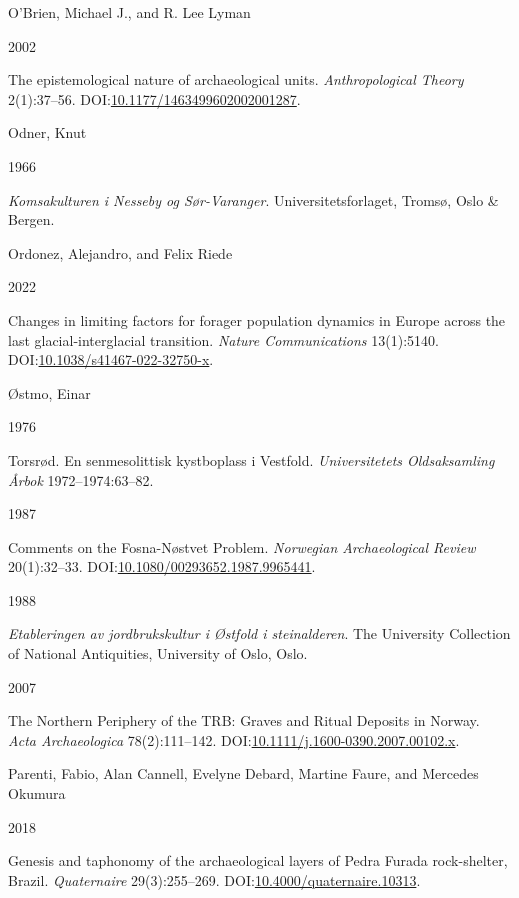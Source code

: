 \documentclass[
  12pt,
  a4paper,
  oneside]{book}
\newlength{\cslhangindent}
\newlength{\csllabelwidth}
\newlength{\cslentryspacingunit} %
\newenvironment{CSLReferences}[2] %
 {%
  \setlength{\parindent}{0pt}
  \ifodd #1
  \let\oldpar\par
  \def\par{\hangindent=\cslhangindent\oldpar}
  \fi
  \setlength{\parskip}{#2\cslentryspacingunit}
 }%
 {}
\newcommand{\CSLBlock}[1]{#1\hfill\break}
\newcommand{\CSLLeftMargin}[1]{\parbox[t]{\csllabelwidth}{#1}}
\newcommand{\CSLRightInline}[1]{\parbox[t]{\linewidth - \csllabelwidth}{#1}\break}
\begin{document}
\begin{CSLReferences}{0}{0}
\leavevmode{}%
\CSLBlock{O'Brien, Michael J., and R. Lee Lyman}
\CSLLeftMargin{ 2002}
\CSLRightInline{{The epistemological nature of archaeological units}. \emph{Anthropological Theory} 2(1):37--56. DOI:\href{https://doi.org/10.1177/1463499602002001287}{10.1177/1463499602002001287}.}

\leavevmode{}%
\CSLBlock{Odner, Knut}
\CSLLeftMargin{ 1966}
\CSLRightInline{\emph{{Komsakulturen i Nesseby og Sør-Varanger}}. Universitetsforlaget, Tromsø, Oslo \& Bergen.}

\leavevmode{}%
\CSLBlock{Ordonez, Alejandro, and Felix Riede}
\CSLLeftMargin{ 2022}
\CSLRightInline{{Changes in limiting factors for forager population dynamics in Europe across the last glacial-interglacial transition}. \emph{Nature Communications} 13(1):5140. DOI:\href{https://doi.org/10.1038/s41467-022-32750-x}{10.1038/s41467-022-32750-x}.}

\leavevmode{}%
\CSLBlock{Østmo, Einar}
\CSLLeftMargin{ 1976}
\CSLRightInline{{Torsrød. En senmesolittisk kystboplass i Vestfold}. \emph{Universitetets Oldsaksamling Årbok} 1972--1974:63--82.}

\leavevmode{}%
\CSLLeftMargin{ 1987 }
\CSLRightInline{{Comments on the Fosna-Nøstvet Problem}. \emph{Norwegian Archaeological Review} 20(1):32--33. DOI:\href{https://doi.org/10.1080/00293652.1987.9965441}{10.1080/00293652.1987.9965441}.}

\leavevmode{}%
\CSLLeftMargin{ 1988 }
\CSLRightInline{\emph{{Etableringen av jordbrukskultur i Østfold i steinalderen}}. The University Collection of National Antiquities, University of Oslo, Oslo.}

\leavevmode{}%
\CSLLeftMargin{ 2007 }
\CSLRightInline{{The Northern Periphery of the TRB: Graves and Ritual Deposits in Norway}. \emph{Acta Archaeologica} 78(2):111--142. DOI:\href{https://doi.org/10.1111/j.1600-0390.2007.00102.x}{10.1111/j.1600-0390.2007.00102.x}.}

\leavevmode{}%
\CSLBlock{Parenti, Fabio, Alan Cannell, Evelyne Debard, Martine Faure, and Mercedes Okumura}
\CSLLeftMargin{ 2018}
\CSLRightInline{Genesis and taphonomy of the archaeological layers of Pedra Furada rock-shelter, Brazil. \emph{Quaternaire} 29(3):255--269. DOI:\href{https://doi.org/10.4000/quaternaire.10313}{10.4000/quaternaire.10313}.}


\end{CSLReferences}
\end{document}
